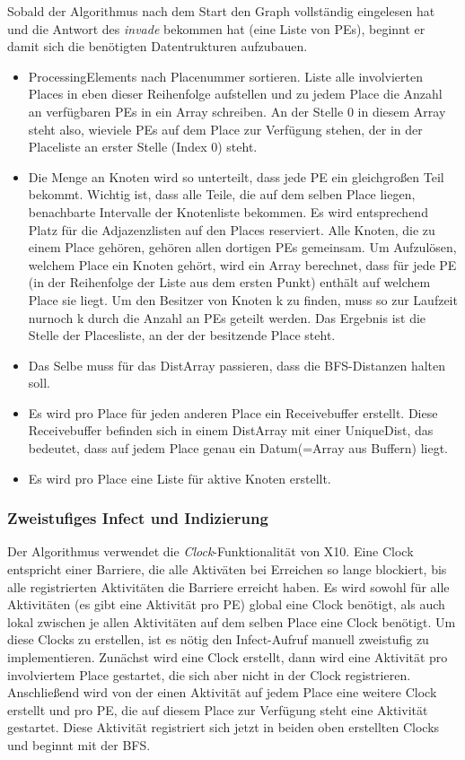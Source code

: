 Sobald der Algorithmus nach dem Start den Graph vollständig eingelesen hat und die Antwort des \textit{invade} bekommen hat (eine Liste von PEs), beginnt er damit sich die benötigten Datentrukturen aufzubauen.
\begin{itemize}
	\item ProcessingElements nach Placenummer sortieren. Liste alle involvierten Places in eben dieser Reihenfolge aufstellen und zu jedem Place die Anzahl an verfügbaren PEs in ein Array schreiben. An der Stelle 0 in diesem Array steht also, wieviele PEs auf dem Place zur Verfügung stehen, der in der Placeliste an erster Stelle (Index 0) steht.
	\item Die Menge an Knoten wird so unterteilt, dass jede PE ein gleichgroßen Teil bekommt. Wichtig ist, dass alle Teile, die auf dem selben Place liegen, benachbarte Intervalle der Knotenliste bekommen. Es wird entsprechend Platz für die Adjazenzlisten auf den Places reserviert. Alle Knoten, die zu einem Place gehören, gehören allen dortigen PEs gemeinsam. Um Aufzulösen, welchem Place ein Knoten gehört, wird ein Array berechnet, dass für jede PE (in der Reihenfolge der Liste aus dem ersten Punkt) enthält auf welchem Place sie liegt. Um den Besitzer von Knoten k zu finden, muss so zur Laufzeit nurnoch k durch die Anzahl an PEs geteilt werden. Das Ergebnis ist die Stelle der Placesliste, an der der besitzende Place steht.
	\item Das Selbe muss für das DistArray passieren, dass die BFS-Distanzen halten soll.
	\item Es wird pro Place für jeden anderen Place ein Receivebuffer erstellt. Diese Receivebuffer befinden sich in einem DistArray mit einer UniqueDist, das bedeutet, dass auf jedem Place genau ein Datum(=Array aus Buffern) liegt.
	\item Es wird pro Place eine Liste für aktive Knoten erstellt.
\end{itemize}

\subsubsection{Zweistufiges Infect und Indizierung} %
\label{ssub:zweistufiges_infect}
Der Algorithmus verwendet die \textit{Clock}-Funktionalität von X10. Eine Clock entspricht einer Barriere, die alle Aktiväten bei Erreichen so lange blockiert, bis alle registrierten Aktivitäten die Barriere erreicht haben. Es wird sowohl für alle Aktivitäten (es gibt eine Aktivität pro PE) global eine Clock benötigt, als auch lokal zwischen je allen Aktivitäten auf dem selben Place eine Clock benötigt. Um diese Clocks zu erstellen, ist es nötig den Infect-Aufruf manuell zweistufig zu implementieren. Zunächst wird eine Clock erstellt, dann wird eine Aktivität pro involviertem Place gestartet, die sich aber nicht in der Clock registrieren. Anschließend wird von der einen Aktivität auf jedem Place eine weitere Clock erstellt und pro PE, die auf diesem Place zur Verfügung steht eine Aktivität gestartet. Diese Aktivität registriert sich jetzt in beiden oben erstellten Clocks und beginnt mit der BFS.

